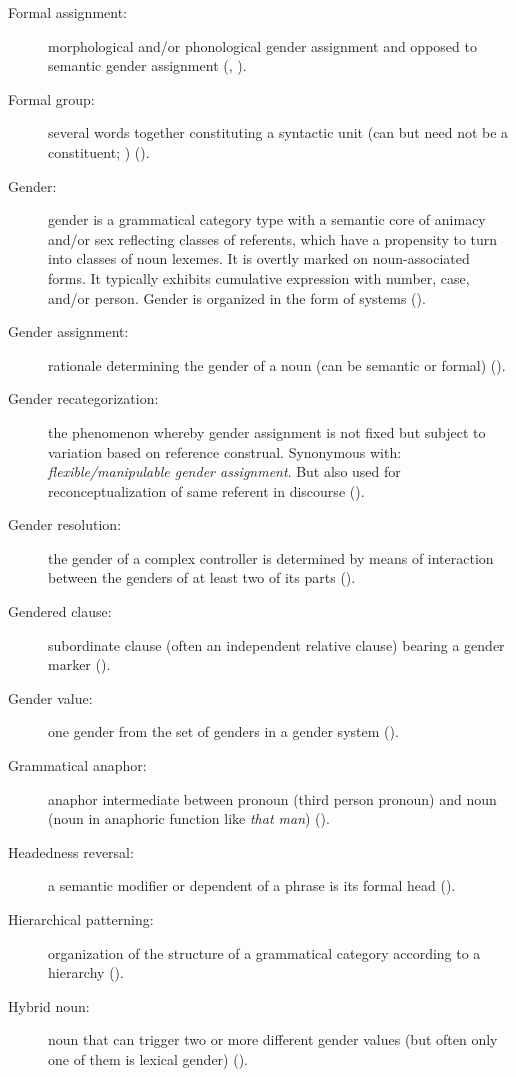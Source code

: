 \documentclass[output=collectionpaper]{langsci/langscibook}
\begin{document}
{\begin{description}
\item  [Formal assignment:] morphological and/or phonological gender assignment and opposed to semantic gender assignment (, ).
\item  [Formal group:] several words together constituting a syntactic unit (can but need not be a constituent; \citealt[190]{Croft2001}) ().
\item  [Gender:] gender is a grammatical category type with a semantic core of animacy and/or sex reflecting classes of referents, which have a propensity to turn into classes of noun lexemes. It is overtly marked on noun-associated forms. It typically exhibits cumulative expression with number, case, and/or person. Gender is organized in the form of systems ().
\item  [Gender assignment:] rationale determining the gender of a noun (can be semantic or formal) ().
\item  [Gender recategorization:] the phenomenon whereby gender assignment is not fixed but subject to variation based on reference construal. Synonymous with: \emph{flexible/manipulable gender assignment}. But also used for reconceptualization of same referent in discourse ().
%
\item  [Gender resolution:] the gender of a complex controller is determined by means of interaction between the genders of at least two of its parts ().
\item  [Gendered clause:] subordinate clause (often an independent relative clause) bearing a gender marker ().
\item  [Gender value:] one gender from the set of genders in a gender system ().
\item  [Grammatical anaphor:] anaphor intermediate between pronoun (third person pronoun) and noun (noun in anaphoric function like \textit{that man}) ().
\item  [Headedness reversal:] a semantic modifier or dependent of a phrase is its formal head ().
\item  [Hierarchical patterning:] organization of the structure of a grammatical category according to a hierarchy ().
\item  [Hybrid noun:] noun that can trigger two or more different gender values (but often only one of them is lexical gender) ().

\end{description}}
\end{document}
